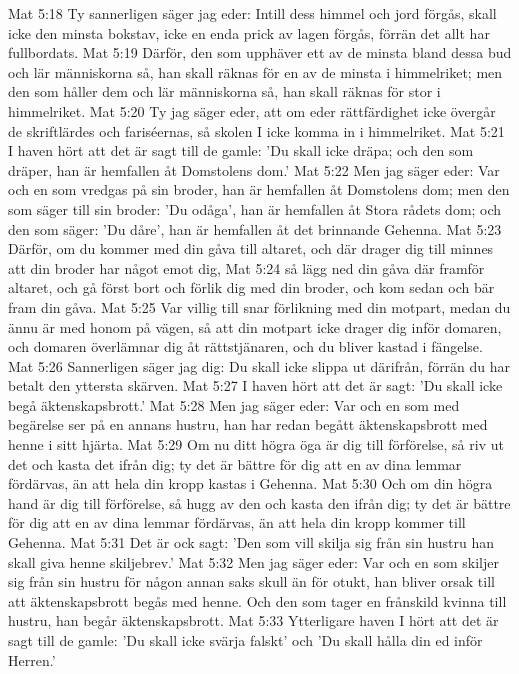 Mat 5:18  Ty sannerligen säger jag eder: Intill dess himmel och jord förgås, skall icke den minsta bokstav, icke en enda prick av lagen förgås, förrän det allt har fullbordats.
Mat 5:19  Därför, den som upphäver ett av de minsta bland dessa bud och lär människorna så, han skall räknas för en av de minsta i himmelriket; men den som håller dem och lär människorna så, han skall räknas för stor i himmelriket.
Mat 5:20  Ty jag säger eder, att om eder rättfärdighet icke övergår de skriftlärdes och fariséernas, så skolen I icke komma in i himmelriket.
Mat 5:21  I haven hört att det är sagt till de gamle: 'Du skall icke dräpa; och den som dräper, han är hemfallen åt Domstolens dom.'
Mat 5:22  Men jag säger eder: Var och en som vredgas på sin broder, han är hemfallen åt Domstolens dom; men den som säger till sin broder: 'Du odåga', han är hemfallen åt Stora rådets dom; och den som säger: 'Du dåre', han är hemfallen åt det brinnande Gehenna.
Mat 5:23  Därför, om du kommer med din gåva till altaret, och där drager dig till minnes att din broder har något emot dig,
Mat 5:24  så lägg ned din gåva där framför altaret, och gå först bort och förlik dig med din broder, och kom sedan och bär fram din gåva.
Mat 5:25  Var villig till snar förlikning med din motpart, medan du ännu är med honom på vägen, så att din motpart icke drager dig inför domaren, och domaren överlämnar dig åt rättstjänaren, och du bliver kastad i fängelse.
Mat 5:26  Sannerligen säger jag dig: Du skall icke slippa ut därifrån, förrän du har betalt den yttersta skärven.
Mat 5:27  I haven hört att det är sagt: 'Du skall icke begå äktenskapsbrott.'
Mat 5:28  Men jag säger eder: Var och en som med begärelse ser på en annans hustru, han har redan begått äktenskapsbrott med henne i sitt hjärta.
Mat 5:29  Om nu ditt högra öga är dig till förförelse, så riv ut det och kasta det ifrån dig; ty det är bättre för dig att en av dina lemmar fördärvas, än att hela din kropp kastas i Gehenna.
Mat 5:30  Och om din högra hand är dig till förförelse, så hugg av den och kasta den ifrån dig; ty det är bättre för dig att en av dina lemmar fördärvas, än att hela din kropp kommer till Gehenna.
Mat 5:31  Det är ock sagt: 'Den som vill skilja sig från sin hustru han skall giva henne skiljebrev.'
Mat 5:32  Men jag säger eder: Var och en som skiljer sig från sin hustru för någon annan saks skull än för otukt, han bliver orsak till att äktenskapsbrott begås med henne. Och den som tager en frånskild kvinna till hustru, han begår äktenskapsbrott.
Mat 5:33  Ytterligare haven I hört att det är sagt till de gamle: 'Du skall icke svärja falskt' och 'Du skall hålla din ed inför Herren.'

